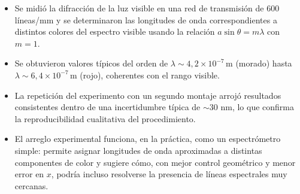 \documentclass[11pt,twocolumn]{article}
\begin{document}
\begin{itemize}
    \item Se midió la difracción de la luz visible en una red de transmisión de 600 líneas/mm y se determinaron las longitudes de onda correspondientes a distintos colores del espectro visible usando la relación $a \sin\theta = m \lambda$ con $m=1$.
    \item Se obtuvieron valores típicos del orden de $\lambda \sim 4{,}2\times10^{-7}\,\text{m}$ (morado) hasta $\lambda \sim 6{,}4\times10^{-7}\,\text{m}$ (rojo), coherentes con el rango visible.
    \item La repetición del experimento con un segundo montaje arrojó resultados consistentes dentro de una incertidumbre típica de $\sim 30$ nm, lo que confirma la reproducibilidad cualitativa del procedimiento.
    \item El arreglo experimental funciona, en la práctica, como un espectrómetro simple: permite asignar longitudes de onda aproximadas a distintas componentes de color y sugiere cómo, con mejor control geométrico y menor error en $x$, podría incluso resolverse la presencia de líneas espectrales muy cercanas.
\end{itemize}

\begingroup
\raggedright
\printbibliography
\endgroup
\end{document}
